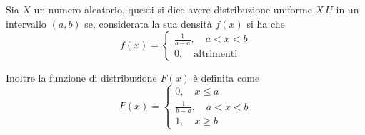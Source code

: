 \documentclass{subfiles}
\begin{document}
Sia \(X\) un numero aleatorio, questi si dice avere distribuzione uniforme \(X ~ U\) in un intervallo \((a, b)\) se, considerata la sua densità \(f(x)\) si ha che
\[
    f(x) = \begin{cases}
        \frac{1}{b - a}, \quad a < x < b \\
        0, \quad \text{altrimenti}
    \end{cases}\]

Inoltre la funzione di distribuzione \(F(x)\) è definita come
\[
    F(x) = \begin{cases}
        0, \quad x \le a                 \\
        \frac{1}{b - a}, \quad a < x < b \\
        1, \quad x \ge b
    \end{cases}\]
\end{document}
